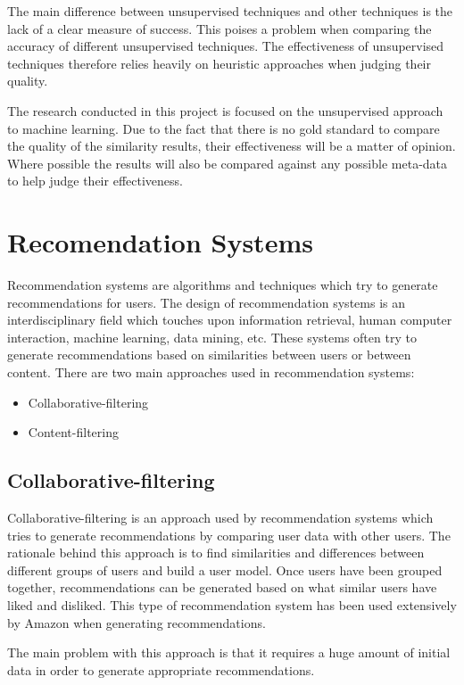 The main difference between unsupervised techniques and other techniques is the lack of a clear measure of success.
This poises a problem when comparing the accuracy of different unsupervised techniques.
The effectiveness of unsupervised techniques therefore relies heavily on heuristic approaches when judging their quality\cite{elementsStat}.

The research conducted in this project is focused on the unsupervised approach to machine learning.
Due to the fact that there is no gold standard to compare the quality of the similarity results, their effectiveness will be a matter of opinion.
Where possible the results will also be compared against any possible meta-data to help judge their effectiveness.

\section{Recomendation Systems}
Recommendation systems are algorithms and techniques which try to generate recommendations for users.
The design of recommendation systems is an interdisciplinary field which touches upon information retrieval, human computer interaction, machine learning, data mining, etc.
These systems often try to generate recommendations based on similarities between users or between content.
There are two main approaches used in recommendation systems\cite{recHandbookIntro}:

\begin{itemize}
    \item Collaborative-filtering
    \item Content-filtering
\end{itemize}

\subsection{Collaborative-filtering}
Collaborative-filtering is an approach used by recommendation systems which tries to generate recommendations by comparing user data with other users.
The rationale behind this approach is to find similarities and differences  between different groups of users and build a user model.
Once users have been grouped together, recommendations can be generated based on what similar users have liked and disliked.
This type of recommendation system has been used extensively by Amazon when generating recommendations\cite{recHandbookIntro}.

The main problem with this approach is that it requires a huge amount of initial data in order to generate appropriate recommendations.

